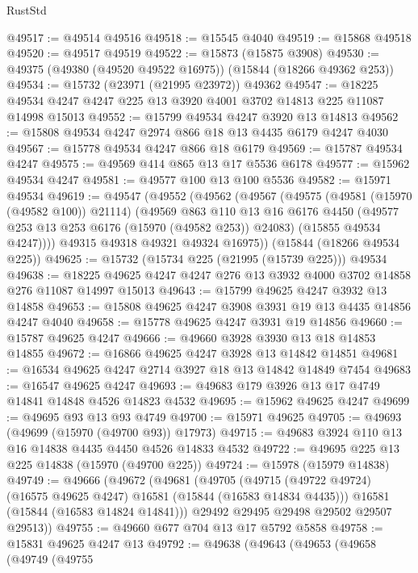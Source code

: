 \begin{lexlean}{RustStd}
\begin{coremodule}
@49517 := @49514 @49516
@49518 := @15545 @4040
@49519 := @15868 @49518
@49520 := @49517 @49519
@49522 := @15873 (@15875 @3908)
@49530 := @49375 (@49380 (@49520 @49522 @16975)) (@15844 (@18266 @49362 @253))
@49534 := @15732 (@23971 (@21995 @23972)) @49362
@49547 := @18225 @49534 @4247 @4247 @225 @13 @3920 @4001 @3702 @14813 @225 @11087 @14998 @15013
@49552 := @15799 @49534 @4247 @3920 @13 @14813
@49562 := @15808 @49534 @4247 @2974 @866 @18 @13 @4435 @6179 @4247 @4030
@49567 := @15778 @49534 @4247 @866 @18 @6179
@49569 := @15787 @49534 @4247
@49575 := @49569 @414 @865 @13 @17 @5536 @6178
@49577 := @15962 @49534 @4247
@49581 := @49577 @100 @13 @100 @5536
@49582 := @15971 @49534
@49619 := @49547
    (@49552
      (@49562
        (@49567
          (@49575
            (@49581 (@15970 (@49582 @100)) @21114)
            (@49569
              @863
              @110
              @13
              @16
              @6176
              @4450
              (@49577 @253 @13 @253 @6176 (@15970 (@49582 @253)) @24083)
              (@15855 @49534 @4247))))
        @49315
        @49318
        @49321
        @49324
        @16975))
    (@15844 (@18266 @49534 @225))
@49625 := @15732 (@15734 @225 (@21995 (@15739 @225))) @49534
@49638 := @18225 @49625 @4247 @4247 @276 @13 @3932 @4000 @3702 @14858 @276 @11087 @14997 @15013
@49643 := @15799 @49625 @4247 @3932 @13 @14858
@49653 := @15808 @49625 @4247 @3908 @3931 @19 @13 @4435 @14856 @4247 @4040
@49658 := @15778 @49625 @4247 @3931 @19 @14856
@49660 := @15787 @49625 @4247
@49666 := @49660 @3928 @3930 @13 @18 @14853 @14855
@49672 := @16866 @49625 @4247 @3928 @13 @14842 @14851
@49681 := @16534 @49625 @4247 @2714 @3927 @18 @13 @14842 @14849 @7454
@49683 := @16547 @49625 @4247
@49693 := @49683 @179 @3926 @13 @17 @4749 @14841 @14848 @4526 @14823 @4532
@49695 := @15962 @49625 @4247
@49699 := @49695 @93 @13 @93 @4749
@49700 := @15971 @49625
@49705 := @49693 (@49699 (@15970 (@49700 @93)) @17973)
@49715 := @49683 @3924 @110 @13 @16 @14838 @4435 @4450 @4526 @14833 @4532
@49722 := @49695 @225 @13 @225 @14838 (@15970 (@49700 @225))
@49724 := @15978 (@15979 @14838)
@49749 := @49666
    (@49672
      (@49681
        (@49705
          (@49715 (@49722 @49724) (@16575 @49625 @4247) @16581 (@15844 (@16583 @14834 @4435)))
          @16581
          (@15844 (@16583 @14824 @14841)))
        @29492
        @29495
        @29498
        @29502
        @29507
        @29513))
@49755 := @49660 @677 @704 @13 @17 @5792 @5858
@49758 := @15831 @49625 @4247 @13
@49792 := @49638
    (@49643
      (@49653
        (@49658
          (@49749
            (@49755

\end{coremodule}
\end{lexlean}
